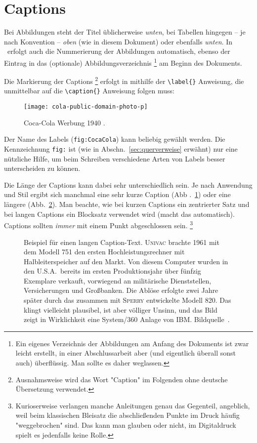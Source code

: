 \section{Captions}

Bei Abbildungen steht der Titel üblicherweise \emph{unten}, bei Tabellen
hingegen -- je nach Konvention -- \emph{oben} (wie in diesem Dokument) oder
ebenfalls \emph{unten}. In \latex\ erfolgt auch die Nummerierung der
Abbildungen automatisch, ebenso der Eintrag in das (optionale)
Abbildungsverzeichnis%
\footnote{Ein eigenes Verzeichnis der Abbildungen am Anfang des Dokuments ist
zwar leicht erstellt, in einer Abschlussarbeit aber (und eigentlich überall
sonst auch) überflüssig. Man sollte es daher weglassen.} am Beginn des
Dokuments.

Die Markierung der Captions%
\footnote{Ausnahmsweise wird das Wort "Caption" im Folgenden ohne deutsche
	Übersetzung verwendet.}
erfolgt in \latex mithilfe der \verb!\label{}! Anweisung, die unmittelbar auf
die \verb!\caption{}! Anweisung folgen muss:
%
\begin{LaTeXCode}[numbers=none]
\begin{figure}
	\centering
	\texttt{[image: cola-public-domain-photo-p]}
	\caption{Coca-Cola Werbung 1940 \cite{CocaCola1940}.}
	\label{fig:CocaCola}
\end{figure}
\end{LaTeXCode}
%
Der Name des Labels (\texttt{fig:CocaCola}) kann beliebig gewählt werden. Die
Kennzeichnung \texttt{fig:} ist (wie in Abschn.\ \ref{sec:querverweise}
erwähnt) nur eine nützliche Hilfe, um beim Schreiben verschiedene Arten von
Labels besser unterscheiden zu können.

Die Länge der Captions kann dabei sehr unterschiedlich sein. Je nach
Anwendung und Stil ergibt sich manchmal eine sehr kurze Caption
(Abb .~\ref{fig:CocaCola}) oder eine längere (Abb.~\ref{fig:ibm360}).
Man beachte, wie bei kurzen Captions ein zentrierter Satz und bei langen
Captions ein Blocksatz verwendet wird (\latex macht das automatisch).
Captions sollten \emph{immer} mit einem Punkt abgeschlossen sein.%
\footnote{Kurioserweise verlangen manche Anleitungen genau das Gegenteil,
	angeblich, weil beim klassischen Bleisatz die abschließenden Punkte im
	Druck häufig "weggebrochen" sind. Das kann man glauben oder nicht, im
	Digitaldruck spielt es jedenfalls keine Rolle.}

\begin{figure}
	\centering
	\caption{Beispiel für einen langen Caption-Text. \textsc{Univac} brachte
	1961 mit dem Modell 751 den ersten Hochleistungsrechner mit
	Halbleiterspeicher auf den Markt. Von diesem Computer wurden in den U.S.A.\
	bereits im ersten Produktionsjahr über fünfzig Exemplare verkauft,
	vorwiegend an militärische Dienststellen, Versicherungen und
	Großbanken. Die Ablöse erfolgte zwei Jahre später durch das zusammen
	mit \textsc{Sperry} entwickelte Modell 820. Das klingt vielleicht
	plausibel, ist aber völliger Unsinn, und das Bild zeigt in Wirklichkeit
	eine System/360 Anlage von IBM. Bildquelle~\cite{IBM360}.}
	\label{fig:ibm360}
\end{figure}


